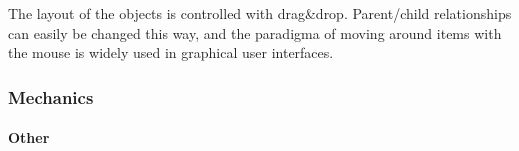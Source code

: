 The layout of the objects is controlled with drag\&drop. Parent/child relationships can easily be changed this way, and the paradigma of moving around items with the mouse is widely used in graphical user interfaces.

\subsubsection{Mechanics}

\paragraph{Other}
